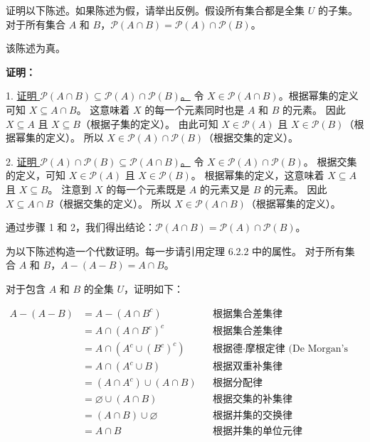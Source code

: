 \begin{questions}
\question
证明以下陈述。如果陈述为假，请举出反例。假设所有集合都是全集 $U$ 的子集。
对于所有集合 $A$ 和 $B$，$\mathcal{P}(A \cap B) = \mathcal{P}(A) \cap \mathcal{P}(B)$。

\begin{solution}
该陈述为真。

\textbf{证明：}

1. \underline{证明 $\mathcal{P}(A \cap B) \subseteq \mathcal{P}(A) \cap \mathcal{P}(B)$。}
令 $X \in \mathcal{P}(A \cap B)$。根据幂集的定义可知 $X \subseteq A \cap B$。
这意味着 $X$ 的每一个元素同时也是 $A$ 和 $B$ 的元素。
因此 $X \subseteq A$ 且 $X \subseteq B$（根据子集的定义）。
由此可知 $X \in \mathcal{P}(A)$ 且 $X \in \mathcal{P}(B)$（根据幂集的定义）。
所以 $X \in \mathcal{P}(A) \cap \mathcal{P}(B)$（根据交集的定义）。

2. \underline{证明 $\mathcal{P}(A) \cap \mathcal{P}(B) \subseteq \mathcal{P}(A \cap B)$。}
令 $X \in \mathcal{P}(A) \cap \mathcal{P}(B)$。
根据交集的定义，可知 $X \in \mathcal{P}(A)$ 且 $X \in \mathcal{P}(B)$。
根据幂集的定义，这意味着 $X \subseteq A$ 且 $X \subseteq B$。
注意到 $X$ 的每一个元素既是 $A$ 的元素又是 $B$ 的元素。
因此 $X \subseteq A \cap B$（根据交集的定义）。
所以 $X \in \mathcal{P}(A \cap B)$（根据幂集的定义）。

通过步骤 1 和 2，我们得出结论：$\mathcal{P}(A \cap B) = \mathcal{P}(A) \cap \mathcal{P}(B)$。
\end{solution}

\question
为以下陈述构造一个代数证明。每一步请引用定理 6.2.2 中的属性。
对于所有集合 $A$ 和 $B$，$A - (A - B) = A \cap B$。

\begin{solution}
对于包含 $A$ 和 $B$ 的全集 $U$，证明如下：

\begin{align*}
A - (A - B) &= A - (A \cap B^c) && \text{根据集合差集律} \\
&= A \cap (A \cap B^c)^c && \text{根据集合差集律} \\
&= A \cap (A^c \cup (B^c)^c) && \text{根据德·摩根定律 (De Morgan's law)} \\
&= A \cap (A^c \cup B) && \text{根据双重补集律} \\
&= (A \cap A^c) \cup (A \cap B) && \text{根据分配律} \\
&= \varnothing \cup (A \cap B) && \text{根据交集的补集律} \\
&= (A \cap B) \cup \varnothing && \text{根据并集的交换律} \\
&= A \cap B && \text{根据并集的单位元律}
\end{align*}
\end{solution}


\end{questions}
